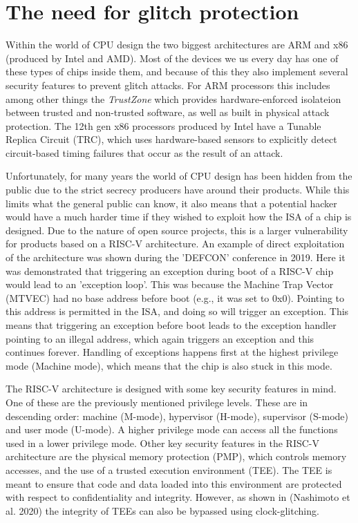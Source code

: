 \section{The need for glitch protection}

Within the world of CPU design the two biggest architectures are ARM and x86 (produced by Intel and AMD). Most of the devices we us every day has one of these types of chips inside them, and because of this they also implement several security features to prevent glitch attacks. For ARM processors this includes among other things the \textit{TrustZone} which provides hardware-enforced isolateion between trusted and non-trusted software, as well as built in physical attack protection\cite{arm}. The 12th gen x86 processors produced by Intel have a Tunable Replica Circuit (TRC), which uses hardware-based sensors to explicitly detect circuit-based timing failures that occur as the result of an attack\cite{intel}.  

Unfortunately, for many years the world of CPU design has been hidden from the public due to the strict secrecy producers have around their products. While this limits what the general public can know, it also means that a potential hacker would have a much harder time if they wished to exploit how the ISA of a chip is designed. Due to the nature of open source projects, this is a larger vulnerability for products based on a RISC-V architecture. An example of direct exploitation of the architecture was shown during the 'DEFCON' conference in 2019\cite{isa_exploit}. Here it was demonstrated that triggering an exception during boot of a RISC-V chip would lead to an 'exception loop'. This was because the Machine Trap Vector (MTVEC) had no base address before boot (e.g., it was set to 0x0). Pointing to this address is permitted in the ISA, and doing so will trigger an exception. This means that triggering an exception before boot leads to the exception handler pointing to an illegal address, which again triggers an exception and this continues forever. Handling of exceptions happens first at the highest privilege mode (Machine mode), which means that the chip is also stuck in this mode. 

The RISC-V architecture is designed with some key security features in mind. One of these are the previously mentioned privilege levels. These are in descending order: machine (M-mode), hypervisor (H-mode), supervisor (S-mode) and user mode (U-mode). A higher privilege mode can access all the functions used in a lower privilege mode\cite{source2}. Other key security features in the RISC-V architecture are the physical memory protection (PMP), which controls memory accesses, and the use of a trusted execution environment (TEE). The TEE is meant to ensure that code and data loaded into this environment are protected with respect to confidentiality and integrity. However, as shown in (Nashimoto et al. 2020) the integrity of TEEs can also be bypassed using clock-glitching\cite{source2}.

